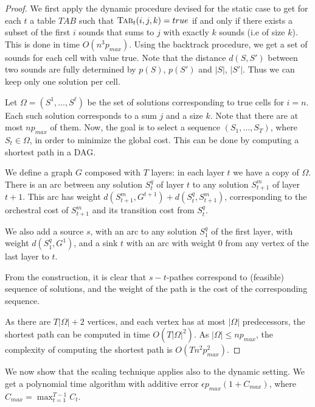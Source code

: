 \documentclass[a4paper]{book}
\newtheorem{theorem}{Theorem}[chapter]
\newtheorem{proof}{\noindent{\bf Proof.} }
\begin{document}
\begin{proof}
We first apply the dynamic procedure devised for the static case to get for each $t$ a table 
$TAB$ such that $\text{\sc{Tab}}_t(i,j,k) = true$ if and only if there exists a subset of the first $i$ sounds that sums to $j$ with exactly $k$ sounds (i.e of size $k$). This is done in time $O(n^3p_{max})$. Using the backtrack procedure, we get a set of sounds for each cell with value true. Note that the distance $d(S,S')$ between two sounds are fully determined by $p(S)$, $p(S')$ and $|S|$, $|S'|$. Thus we can keep only one solution per cell.

Let $\Omega=(S^1,\dots,S^\ell)$ be the set of solutions corresponding to true cells for $i=n$. Each such solution corresponds to a sum $j$ and a size $k$. Note that there are at most $np_{max}$ of them. Now, the goal is to select a sequence $(S_1,\dots,S_T)$, where $S_t\in \Omega$, in order to minimize the global cost. This can be done by computing a shortest path in a DAG. 

We define a graph $G$ composed with $T$ layers: in each layer $t$ we have a copy of $\Omega$. There is an arc between any solution $S^q_t$ of layer $t$ to any solution $S^{m}_{t+1}$ of layer $t+1$. This arc has weight $d(S^m_{t+1},G^{t+1})+d(S^q_t,S^m_{t+1})$, corresponding to the orchestral cost of $S^m_{t+1}$ and its transition cost from $S^q_t$. 

We also add a source $s$, with an arc to any solution $S^q_1$ of the first layer, with weight $d(S^q_{1},G^{1})$, and a sink $t$ with an arc with weight 0 from any vertex of the last layer to $t$. 

From the construction, it is clear that $s-t$-pathes correspond to (feasible) sequence of solutions, and the weight of the path is the cost of the corresponding sequence. 

As there are $T|\Omega|+2$ vertices, and each vertex has at most $|\Omega|$ predecessors, the shortest path can be computed in time $O(T|\Omega|^2)$. As $|\Omega|\leq np_{max}$, the complexity of computing the shortest path is $O(Tn^2p_{max}^2)$.
\end{proof}

We now show that the scaling technique applies also to the dynamic setting. We get a polynomial time algorithm with additive error $\epsilon p_{max}(1+C_{max})$, where $C_{max}=\max_{t=1}^{T-1} C_t$. 

\end{document}
